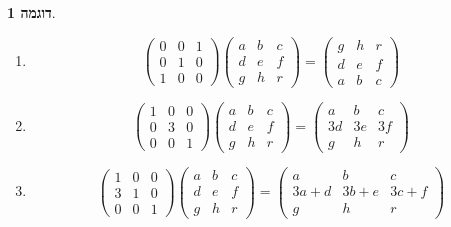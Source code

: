 \documentclass[12pt]{report}
\theoremstyle{plain}
\theoremstyle{definition}
\newtheorem{example}{דוגמה}[chapter]
\newcommand{\0}{\mathbf{0}}
\begin{document}
\begin{example}\
\begin{enumerate}[label=\alph*.]
\item
$$
\begin{pmatrix}
0 &0 &1 \\
0 & 1 &0 \\
1 &0 &0
\end{pmatrix}\begin{pmatrix}
a &b &c \\
d & e &f \\
g &h &r
\end{pmatrix}=\begin{pmatrix}
g &h &r \\
d & e &f \\
a &b &c 
\end{pmatrix}
$$


\item 
$$
\begin{pmatrix}
1 &0 &0 \\
0 & 3 &0 \\
0 &0 &1
\end{pmatrix}\begin{pmatrix}
a &b &c \\
d & e &f \\
g &h &r
\end{pmatrix}=\begin{pmatrix}
a &b &c \\
3d & 3e &3f \\
g &h &r
\end{pmatrix}
$$


\item 

$$
\begin{pmatrix}
1 &0 &0 \\
3 & 1 &0 \\
0 &0 &1
\end{pmatrix}\begin{pmatrix}
a &b &c \\
d & e &f \\
g &h &r
\end{pmatrix}=\begin{pmatrix}
a &b &c \\
3a+d & 3b+e &3c+f \\
g &h &r
\end{pmatrix}
$$


\end{enumerate}
\end{example}
\end{document}
